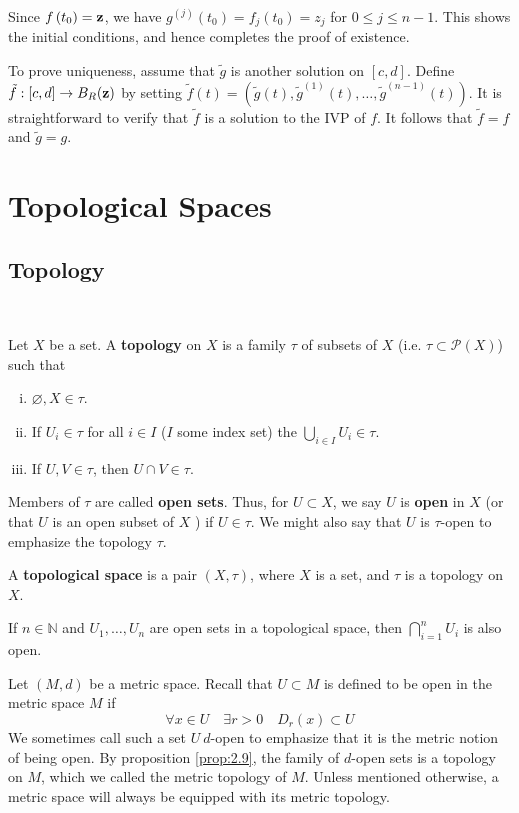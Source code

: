\documentclass[a4paper]{article}
\begin{document}
Since $f\left(t_0\right)={\bf z}$, we have $g^{(j)}\left(t_0\right)=f_j\left(t_0\right)=z_j$ for $0 \leqslant j \leqslant n-1$. This shows the initial conditions, and hence completes the proof of existence.

To prove uniqueness, assume that $\tilde{g}$ is another solution on $[c, d]$. Define $\tilde{f}:[c, d] \rightarrow B_R({\bf z})$ by setting $\tilde{f}(t)=\left(\tilde{g}(t), \tilde{g}^{(1)}(t), \ldots, \tilde{g}^{(n-1)}(t)\right)$. It is straightforward to verify that $\tilde{f}$ is a solution to the IVP of $f$. It follows that $\tilde{f}=f$ and $\tilde{g}=g$.

\section{Topological Spaces}
\subsection{Topology}\ \vspace{-1.5em}
\begin{definition}
    Let $X$ be a set. A \textbf{topology} on $X$ is a family $\tau$ of subsets of $X$ (i.e. $ \tau\subset \mathcal{P}(X) $) such that 
    \begin{enumerate}[(i)]
        \item $ \varnothing, X\in \tau $.
        \item If $U_i\in \tau$ for all $i\in I$ ($I$ some index set) the $ \bigcup_{i\in I} U_i\in \tau $. 
        \item If $ U,V\in \tau $, then $ U\cap V\in \tau $. 
    \end{enumerate}
    Members of $\tau$ are called \textbf{open sets}. Thus, for $U \subset X$, we say $U$ is \textbf{open} in $X$ (or that $U$ is an open subset of $X$ ) if $U \in \tau$. We might also say that $U$ is $\tau$-open to emphasize the topology $\tau$.

    A \textbf{topological space} is a pair $(X, \tau)$, where $X$ is a set, and $\tau$ is a topology on $X$.
\end{definition}

\begin{note}
    If $n \in \mathbb{N}$ and $U_1, \ldots, U_n$ are open sets in a topological space, then $\bigcap_{i=1}^n U_i$ is also open.
\end{note}

\begin{example}
    Let $(M, d)$ be a metric space. Recall that $U \subset M$ is defined to be open in the metric space $M$ if
    \[
    \forall x \in U \quad \exists r>0 \quad D_r(x) \subset U
    \]
    We sometimes call such a set $U\ d$-open to emphasize that it is the metric notion of being open. By proposition \ref{prop:2.9}, the family of $d$-open sets is a topology on $M$, which we called the metric topology of $M$.
    Unless mentioned otherwise, a metric space will always be equipped with its metric topology.
    
\end{example}
\end{document}
